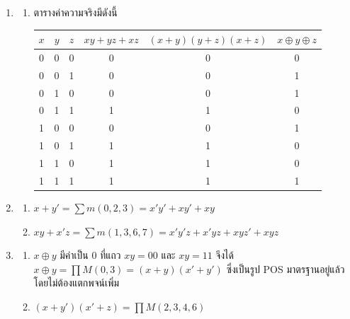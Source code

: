 \begin{enumerate}[resume*=anskey]
    \item
    \begin{enumerate}[label=\textbf{\thechapter.\arabic{enumi}.\arabic*}]
        \item ตารางค่าความจริงมีดังนี้
        \begin{center}
        \begin{tabular}{|c|c|c|c|c|c|}
        \hline
        $x$ & $y$ & $z$ & $xy+yz+xz$ & $(x+y)(y+z)(x+z)$ & $x\oplus y\oplus z$ \\
        \hline
        0 & 0 & 0 & 0 & 0 & 0 \\
        \hline
        0 & 0 & 1 & 0 & 0 & 1 \\
        \hline
        0 & 1 & 0 & 0 & 0 & 1 \\
        \hline
        0 & 1 & 1 & 1 & 1 & 0 \\
        \hline
        1 & 0 & 0 & 0 & 0 & 1 \\
        \hline
        1 & 0 & 1 & 1 & 1 & 0 \\
        \hline
        1 & 1 & 0 & 1 & 1 & 0 \\
        \hline
        1 & 1 & 1 & 1 & 1 & 1 \\
        \hline
        \end{tabular}
        \end{center}
    \end{enumerate}

    \item
    \begin{enumerate}[label=\textbf{\thechapter.\arabic{enumi}.\arabic*}]
        \item $x+y'=\sum m(0,2,3)=x'y'+xy'+xy$
        \item $xy+x'z=\sum m(1,3,6,7)=x'y'z+x'yz+xyz'+xyz$
    \end{enumerate}

    \item
    \begin{enumerate}[label=\textbf{\thechapter.\arabic{enumi}.\arabic*}]
        \item $x \oplus y$ มีค่าเป็น 0 ที่แถว $xy=00$ และ $xy=11$ จึงได้ $x \oplus y=\prod M(0,3)=(x+y)(x'+y')$ ซึ่งเป็นรูป POS มาตรฐานอยู่แล้วโดยไม่ต้องแตกพจน์เพิ่ม
        \item $(x+y')(x'+z)=\prod M(2,3,4,6)$
    \end{enumerate}
\end{enumerate}

